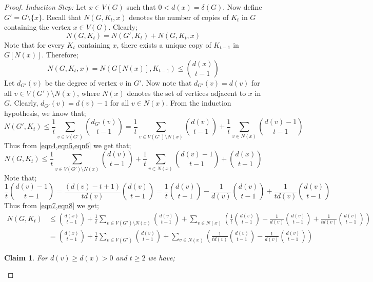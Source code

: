 \documentclass[pdflatex,sn-basic,Numbered]{sn-jnl}
\newtheorem{claim}{Claim}
\begin{document}
\begin{proof}
        \noindent\textit{Induction Step:} Let $x \in V(G)$ such that $0<d(x) = \delta(G)$. Now define $G' = G\setminus \{x\}$. Recall that $N(G,K_t,x)$ denotes the number of copies of $K_t$ in $G$ containing the vertex $x \in V(G)$. Clearly;
    \begin{equation}\label{eqn4}
         N(G,K_t) = N(G',K_t) + N(G,K_t,x)
    \end{equation}
    Note that for every $K_t$ containing $x$, there exists a unique copy of $K_{t-1}$ in $G[N(x)]$. Therefore;
\begin{equation}\label{eqn5}
  N(G,K_t,x) = N(G[N(x)],K_{t-1}) \leq {d(x) \choose t-1}
\end{equation}
Let $d_{G'}(v)$ be the degree of vertex $v$ in $G'$. Now note that $d_{G'}(v) = d(v)$ for all $v\in V(G') \setminus N(x)$, where $N(x)$ denotes the set of vertices adjacent to $x$ in $G$. Clearly, $d_{G'}(v) = d(v) -1$ for all $v \in N(x)$. From the induction hypothesis, we know that;
\begin{equation}\label{eqn6}
    N(G',K_t) \leq \frac{1}{t}\sum_{v \in V(G')}{d_{G'}(v) \choose t-1} = \frac{1}{t}\sum_{v \in V(G')\setminus N(x)}{d(v) \choose t-1} + \frac{1}{t}\sum_{v \in N(x)} {d(v)-1 \choose t-1}
\end{equation}
Thus from \cref{eqn4,eqn5,eqn6} we get that;
\begin{equation}\label{eqn7}
    N(G,K_t) \leq \frac{1}{t}\sum_{v \in V(G')\setminus N(x)}{d(v) \choose t-1} + \frac{1}{t}\sum_{v \in N(x)} {d(v)-1 \choose t-1} +{d(x) \choose t-1}
\end{equation}
Note that;
\begin{equation}\label{eqn8}
    \frac{1}{t}{d(v)-1 \choose t-1} = \frac{(d(v)-t+1)}{td(v)}{d(v) \choose t-1} = \frac{1}{t}{d(v) \choose t-1} - \frac{1}{d(v)}{d(v) \choose t-1}+\frac{1}{td(v)}{d(v) \choose t-1}
\end{equation}
Thus from \cref{eqn7,eqn8} we get;
\begin{align}\label{eqn9}
    N(G,K_t) &\leq {d(x) \choose t-1}+ \frac{1}{t}\sum_{v \in V(G')\setminus N(x)}{d(v) \choose t-1} + \sum_{v \in N(x)} \left(\frac{1}{t}{d(v) \choose t-1} - \frac{1}{d(v)}{d(v) \choose t-1}+\frac{1}{td(v)}{d(v) \choose t-1}\right)\nonumber\\
    &= {d(x) \choose t-1} + \frac{1}{t}\sum_{v\in V(G')}{d(v) \choose t-1}  +  \sum_{v \in N(x)}\left(\frac{1}{td(v)}{d(v) \choose t-1} - \frac{1}{d(v)}{d(v) \choose t-1}\right) 
\end{align}
\begin{claim}\label{claim1} For $d(v) \geq d(x) >0$ and $t \geq 2$ we have;

\end{claim}
\end{proof}
\end{document}
